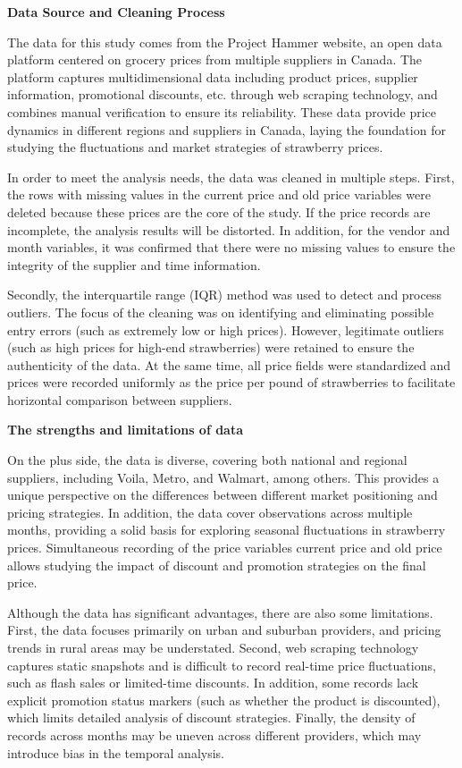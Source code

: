 \documentclass[
  letterpaper,
  DIV=11,
  numbers=noendperiod]{scrartcl}
\begin{document}
\textbf{Data Source and Cleaning Process}

The data for this study comes from the Project Hammer website, an open
data platform centered on grocery prices from multiple suppliers in
Canada. The platform captures multidimensional data including product
prices, supplier information, promotional discounts, etc. through web
scraping technology, and combines manual verification to ensure its
reliability. These data provide price dynamics in different regions and
suppliers in Canada, laying the foundation for studying the fluctuations
and market strategies of strawberry prices.

In order to meet the analysis needs, the data was cleaned in multiple
steps. First, the rows with missing values in the current price and old
price variables were deleted because these prices are the core of the
study. If the price records are incomplete, the analysis results will be
distorted. In addition, for the vendor and month variables, it was
confirmed that there were no missing values to ensure the integrity of
the supplier and time information.

Secondly, the interquartile range (IQR) method was used to detect and
process outliers. The focus of the cleaning was on identifying and
eliminating possible entry errors (such as extremely low or high
prices). However, legitimate outliers (such as high prices for high-end
strawberries) were retained to ensure the authenticity of the data. At
the same time, all price fields were standardized and prices were
recorded uniformly as the price per pound of strawberries to facilitate
horizontal comparison between suppliers.

\textbf{The strengths and limitations of data}

On the plus side, the data is diverse, covering both national and
regional suppliers, including Voila, Metro, and Walmart, among others.
This provides a unique perspective on the differences between different
market positioning and pricing strategies. In addition, the data cover
observations across multiple months, providing a solid basis for
exploring seasonal fluctuations in strawberry prices. Simultaneous
recording of the price variables current price and old price allows
studying the impact of discount and promotion strategies on the final
price.

Although the data has significant advantages, there are also some
limitations. First, the data focuses primarily on urban and suburban
providers, and pricing trends in rural areas may be understated. Second,
web scraping technology captures static snapshots and is difficult to
record real-time price fluctuations, such as flash sales or limited-time
discounts. In addition, some records lack explicit promotion status
markers (such as whether the product is discounted), which limits
detailed analysis of discount strategies. Finally, the density of
records across months may be uneven across different providers, which
may introduce bias in the temporal analysis.
\end{document}
